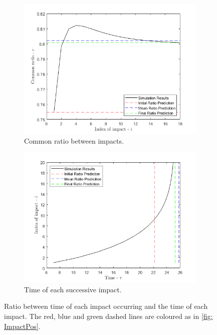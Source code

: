 \begin{figure}[ht]
    \centering
    \begin{subfigure}{0.49\textwidth}
    \includegraphics[width=\textwidth]{Figures/ImpactSeries/CommonRatio.png}
    \caption{Common ratio between impacts.}
    \label{fig: ImpactOtherRatio}
    \end{subfigure}
    \begin{subfigure}{0.49\textwidth}
    \includegraphics[width=\textwidth]{Figures/ImpactSeries/FinalTime.png}
    \caption{Time of each successive impact.}
    \label{fig: ImpactOtherTimes}
    \end{subfigure}
    \caption{Ratio between time of each impact occurring and the time of each impact.
    The red, blue and green dashed lines are coloured as in \cref{fig: ImpactPos}.
    }
    \label{fig: ImpactOther}
\end{figure}

